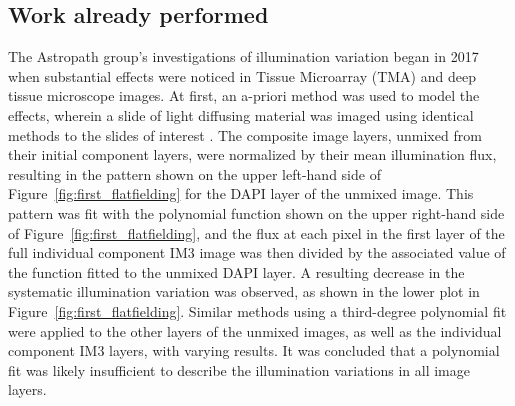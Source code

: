 \documentclass[letterpaper,11pt]{article}
\newcommand{\reffig}[1]{Figure~\ref{#1}}
\begin{document}
\subsection{Work already performed}
\label{ssec:work_already_performed}

The Astropath group's investigations of illumination variation began in 2017 when substantial effects were noticed in Tissue Microarray (TMA) and deep tissue microscope images. At first, an a-priori method was used to model the effects, wherein a slide of light diffusing material was imaged using identical methods to the slides of interest \cite{Alex_flatfielding_1}. The composite image layers, unmixed from their initial component layers, were normalized by their mean illumination flux, resulting in the pattern shown on the upper left-hand side of \reffig{fig:first_flatfielding} for the DAPI layer of the unmixed image. This pattern was fit with the polynomial function shown on the upper right-hand side of \reffig{fig:first_flatfielding}, and the flux at each pixel in the first layer of the full individual component IM3 image was then divided by the associated value of the function fitted to the unmixed DAPI layer. A resulting decrease in the systematic illumination variation was observed, as shown in the lower plot in \reffig{fig:first_flatfielding}. Similar methods using a third-degree polynomial fit were applied to the other layers of the unmixed images, as well as the individual component IM3 layers, with varying results. It was concluded that a polynomial fit was likely insufficient to describe the illumination variations in all image layers.
\end{document}
